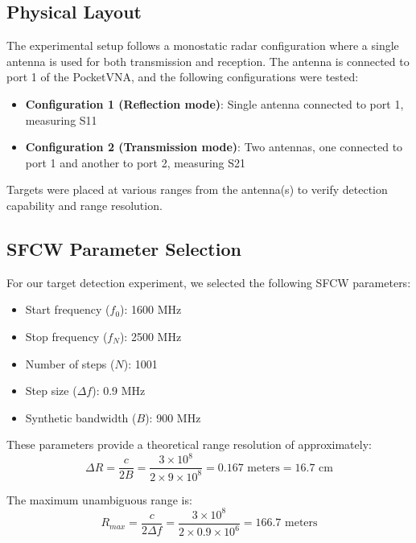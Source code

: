 \documentclass[11pt,a4paper]{article}
\begin{document}
\subsection{Physical Layout}

The experimental setup follows a monostatic radar configuration where a single antenna is used for both transmission and reception. The antenna is connected to port 1 of the PocketVNA, and the following configurations were tested:

\begin{itemize}
    \item \textbf{Configuration 1 (Reflection mode)}: Single antenna connected to port 1, measuring S11
    \item \textbf{Configuration 2 (Transmission mode)}: Two antennas, one connected to port 1 and another to port 2, measuring S21
\end{itemize}

Targets were placed at various ranges from the antenna(s) to verify detection capability and range resolution.

\subsection{SFCW Parameter Selection}

For our target detection experiment, we selected the following SFCW parameters:

\begin{itemize}
    \item Start frequency ($f_0$): 1600 MHz
    \item Stop frequency ($f_N$): 2500 MHz
    \item Number of steps ($N$): 1001
    \item Step size ($\Delta f$): 0.9 MHz
    \item Synthetic bandwidth ($B$): 900 MHz
\end{itemize}

These parameters provide a theoretical range resolution of approximately:
\begin{equation}
    \Delta R = \frac{c}{2B} = \frac{3 \times 10^8}{2 \times 9 \times 10^8} = 0.167 \text{ meters} = 16.7 \text{ cm}
\end{equation}

The maximum unambiguous range is:
\begin{equation}
    R_{max} = \frac{c}{2\Delta f} = \frac{3 \times 10^8}{2 \times 0.9 \times 10^6} = 166.7 \text{ meters}
\end{equation}
\end{document}
